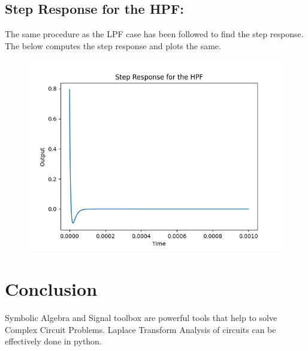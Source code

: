\documentclass[12pt, a4paper]{report}
\begin{document}
\subsection{Step Response for the HPF:}
The same procedure as the LPF case has been followed to find the step response. The below computes the step response and plots the same.
\vspace{100mm}
\noindent

\begin{figure}[h!]
    \centering
    \includegraphics[scale=0.75]{fig6.png} 
    \caption{}
    \label{fig:my_label}
\end{figure}

\section{Conclusion}
Symbolic Algebra and Signal toolbox are powerful tools that help to solve Complex Circuit Problems. Laplace Transform Analysis of circuits can be effectively done in python.
\end{document}
